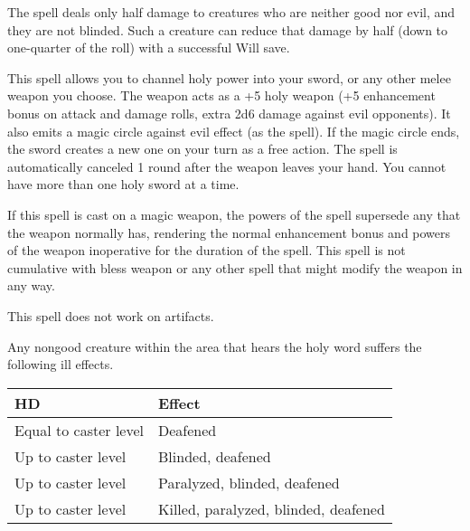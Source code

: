 \begin{multicols}{2}
\begin{small}
\smallskip\noindent The spell deals only half damage to creatures who are neither good nor evil, and they are not blinded. Such a creature can reduce that damage by half (down to one-quarter of the roll) with a successful Will save.

\noindent This spell allows you to channel holy power into your sword, or any other melee weapon you choose. The weapon acts as a +5 holy weapon (+5 enhancement bonus on attack and damage rolls, extra 2d6 damage against evil opponents). It also emits a magic circle against evil effect (as the spell). If the magic circle ends, the sword creates a new one on your turn as a free action. The spell is automatically canceled 1 round after the weapon leaves your hand. You cannot have more than one holy sword at a time.

\smallskip\noindent If this spell is cast on a magic weapon, the powers of the spell supersede any that the weapon normally has, rendering the normal enhancement bonus and powers of the weapon inoperative for the duration of the spell. This spell is not cumulative with bless weapon or any other spell that might modify the weapon in any way.

\smallskip\noindent This spell does not work on artifacts.


\noindent Any nongood creature within the area that hears the holy word suffers the following ill effects.

\begin{center}
\begin{tabular}[h!]{l|p{1.5in}}
HD & Effect \\ \hline
Equal to caster level & Deafened \\
Up to caster level \textendash1 & Blinded, deafened \\
Up to caster level \textendash5 & Paralyzed, blinded, deafened	\\
Up to caster level \textendash10 & Killed, paralyzed, blinded, deafened \\
\end{tabular}
\end{center}


\end{small}
\end{multicols}
